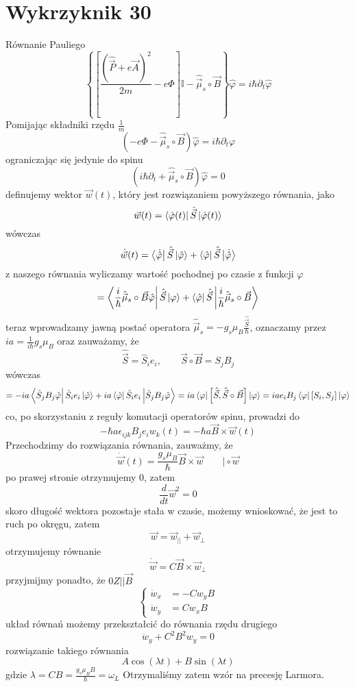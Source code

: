 \documentclass[a4paper,12pt]{article}
\begin{document}
\section{Wykrzyknik 30}
Równanie Pauliego 
$$
\left\{\left[\frac{\left(\hat{\vec{P}}+e\vec{A}\right)^2}{2m}-e\Phi\right]\mathbb{I}-\hat{\vec{\mu}}_s\circ\vec{B} \right\}\hat{\varphi} = i\hbar\partial_t\hat{\varphi}
$$
Pomijając składniki rzędu $\frac{1}{m}$ 
$$
\left(-e\Phi - \hat{\vec{\mu}}_s\circ\vec{B}\right)\hat{\varphi} = i\hbar\partial_t\varphi
$$
ograniczając się jedynie do spinu
$$
\left(i\hbar\partial_t+\hat{\vec{\mu}}_s\circ\vec{B}\right)\hat{\varphi} = 0
$$
definujemy wektor $\vec{w}(t)$, który jest rozwiązaniem powyższego równania, jako
$$
\vec{w}(t) = \bra{\hat{\varphi}(t)}\hat{\vec{S}}\ket{\hat{\varphi}(t)}
$$
wówczas
$$
\dot{\vec{w}}(t) = \bra{\dot{\hat{\varphi}}}\hat{\vec{S}}\ket{\hat{\varphi}}+\bra{\hat{\varphi}}\hat{\vec{S}}\ket{\dot{\hat{\varphi}}}
$$
z naszego równania wyliczamy wartość pochodnej po czasie z funkcji $\varphi$
$$
=\bra{\frac{i}{\hbar}\hat{\vec{\mu}}_s\circ\vec{B}\hat{\varphi}}\hat{\vec{S}}\ket{\varphi} + \bra{\hat{\varphi}}\hat{\vec{S}}\ket{\frac{i}{\hbar}\hat{\vec{\mu}}_s\circ\vec{B}}
$$
teraz wprowadzamy jawną postać operatora $\hat{\vec{\mu}}_s= -g_s\mu_B\frac{\hat{\vec{S}}}{\hbar}$, oznaczamy przez $ia=\frac{1}{i\hbar}g_s\mu_B$ oraz zauważamy, że 
$$
\hat{\vec{S}} = \hat{S}_ie_i,\quad\quad \vec{S}\circ\vec{B} = S_jB_j
$$
wówczas
$$
=-ia\bra{\hat{S}_jB_j\hat{\varphi}}\hat{S}_i e_i\ket{\hat{\varphi}}+ia\bra{\hat{\varphi}}\hat{S}_ie_i\ket{\hat{S}_jB_j\hat{\varphi}} = ia\bra{\varphi}\left[\hat{\vec{S}},\hat{\vec{S}}\circ\vec{B}\right]\ket{\varphi} =ia e_i B_j \bra{\varphi}\left[S_i,S_j\right]\ket{\varphi}
$$
co, po skorzystaniu z reguły komutacji operatorów spinu, prowadzi do
$$
-\hbar a \epsilon_{ijk} B_j e_i w_k(t) =-\hbar a \vec{B}\times\vec{w}(t)
$$
Przechodzimy do rozwiązania równania, zauważmy, że
$$
\dot{\vec{w}}(t)= \frac{g_s\mu_B}{\hbar}\vec{B}\times\vec{w} \quad\quad \bigg| \circ \vec{w}
$$
po prawej stronie otrzymujemy $0$, zatem
$$
\frac{d}{dt}\vec{w}^2 = 0
$$
skoro długość wektora pozostaje stała w czasie, możemy wnioskować, że jest to ruch po okręgu, zatem
$$
\vec{w} = \vec{w}_{||} + \vec{w}_{\perp}
$$
otrzymujemy równanie
$$
\dot{\vec{w}} = C\vec{B}\times\vec{w}_\perp
$$
przyjmijmy ponadto, że $0Z||\vec{B}$
$$
\left\{
\begin{split}
\dot{w}_x &= -Cw_yB\\
\dot{w}_y &= Cw_xB
\end{split}
\right.
$$
układ równań możemy przekształcić do równania rzędu drugiego
$$
\ddot{w}_y+C^2B^2w_y = 0
$$
rozwiązanie takiego równania 
$$
A\cos(\lambda t) + B\sin(\lambda t)
$$
gdzie $\lambda = C B = \frac{g_s\mu_B B}{\hbar} = \omega_L$
Otrzymaliśmy zatem wzór na precesję Larmora.
\end{document}
